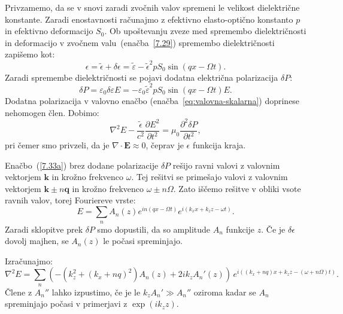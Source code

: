 Privzamemo, da se v snovi zaradi zvočnih valov spremeni le velikost
dielektrične konstante. Zaradi enostavnosti računajmo z efektivno elasto-optično
konstanto $p$ in efektivno deformacijo $S_0$. Ob upoštevanju zveze med
spremembo dielektričnosti in deformacijo
v zvočnem valu~(enačba~\ref{7.29}) spremembo dielektričnosti
zapišemo kot:
\begin{equation}
\epsilon=\tilde{\epsilon}+\delta\epsilon = 
\tilde{\varepsilon} -\tilde{\epsilon}^{2}pS_{0}\sin(qx-\Omega t).
\label{7.33}
\end{equation}
Zaradi spremembe dielektričnosti se pojavi dodatna električna polarizacija 
$\delta P$:
\begin{equation}
\delta P = \varepsilon_0 \delta \varepsilon E = - \varepsilon_0 
\tilde{\varepsilon}^2 p S_0 \sin(qx-\Omega t)E.
\end{equation}
Dodatna polarizacija v valovno enačbo (enačba~\ref{eq:valovna-skalarna}) 
doprinese nehomogen člen. Dobimo:
\begin{equation}
\nabla^{2}E-\frac{\tilde{\epsilon}}{c^{2}}{\frac{\partial E^{2}}
{\partial t^{2}}}=\mu_{0}{\frac{\partial^2 \delta P}{\partial t^{2}}},
\label{7.33a}
\end{equation}
pri čemer smo privzeli, da je $\nabla\cdot\mathbf{E}\approx 0$, čeprav je
$\epsilon$ funkcija kraja. 

Enačbo~(\ref{7.33a}) brez dodane polarizacije $\delta P$ rešijo ravni valovi 
z valovnim vektorjem $\mathbf{k}$ in krožno frekvenco $\omega$. Tej rešitvi se 
primešajo valovi z valovnim vektorjem $\mathbf{k}\pm n\mathbf{q}$
in krožno frekvenco $\omega\pm n\Omega$. Zato iščemo rešitve v obliki vsote
ravnih valov, torej Fouriereve vrste:
\begin{equation}
E=\sum_{n}A_{n}(z)e^{in(qx-\Omega t)}e^{i(k_{x}x+k_{z}z-\omega t)}.
\label{7.34}
\end{equation}
Zaradi sklopitve prek $\delta P$ smo dopustili, da so amplitude
$A_{n}$ funkcije $z$. Če je $\delta\epsilon$ dovolj majhen, se $A_{n}(z)$
le počasi spreminjajo.

Izračunajmo:
\begin{equation}
\nabla^{2}E=\sum_{n}\left( -(k_{z}^{2}+(k_{x}+nq)^{2})A_{n}(z)+2ik_{z}A_{n}'(z)\right) \, 
e^{i((k_x+nq)x+k_{z}z-(\omega+n\Omega)t)}.
\label{7.35}
\end{equation}
Člene z $A_{n}''$ lahko izpustimo, če je le $k_{z}A_{n}'\gg A_{n}''$ oziroma 
kadar se $A_{n}$ spreminjajo počasi v primerjavi z $\exp(ik_{z}z)$. 

